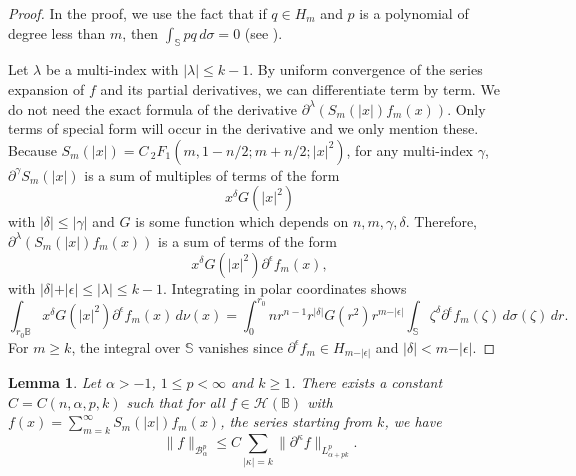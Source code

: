\documentclass{amsart}
\newtheorem{lemma}[theorem]{Lemma}
\theoremstyle{definition}
\theoremstyle{remark}
\begin{document}
\begin{proof}
In the proof, we use the fact that if $q\in H_m$ and $p$ is a polynomial
of degree less than $m$, then $\int_{\mathbb S} pq\,d\sigma=0$
(see \cite[Proposition 5.9]{ABR}).

Let $\lambda$ be a multi-index with $\vert\lambda\vert\le k-1$.
By uniform convergence of the series expansion of $f$ and its partial
derivatives, we can differentiate term by term.
We do not need the exact formula of the derivative
$\partial^\lambda(S_m(\vert x\vert)f_m(x))$.
Only terms of special form will occur in the derivative and we only mention these.
Because $S_m(\vert x\vert)=C\,{}_2F_1(m,1-n/2;m+n/2;\vert x\vert^2)$,
for any multi-index $\gamma$, $\partial^\gamma S_m(\vert x\vert)$ is a
sum of multiples of terms of the form
\begin{equation*}
x^\delta G(\vert x\vert^2)
\end{equation*}
with
$\vert\delta\vert \le\vert\gamma\vert$ and $G$ is some function which
depends on $n,m,\gamma,\delta$.
Therefore, $\partial^\lambda(S_m(\vert x\vert)f_m(x))$ is a sum of terms
of the form
\begin{equation*}
x^\delta G(\vert x\vert^2)\partial^\epsilon f_m(x),
\end{equation*}
with $\vert\delta\vert+\vert\epsilon\vert \le \vert\lambda\vert\le k-1$.
Integrating in polar coordinates shows
\begin{equation*}
\int_{r_0\mathbb B} x^\delta G(\vert x\vert^2)\partial^\epsilon f_m(x)\,d\nu(x)
=\int_0^{r_0} nr^{n-1} r^{\vert\delta\vert}G(r^2)r^{m-\vert\epsilon\vert}
\int_{\mathbb S} \zeta^\delta\partial^\epsilon f_m(\zeta)\,d\sigma(\zeta)\,dr.
\end{equation*}
For $m\ge k$, the integral over $\mathbb S$ vanishes since
$\partial^\epsilon f_m\in H_{m-\vert\epsilon\vert}$ and
$\vert\delta\vert<m-\vert\epsilon\vert$.
\end{proof}

\begin{lemma}\label{LStartk}
Let $\alpha>-1$, $1\le p<\infty$ and $k\ge 1$.
There exists a constant $C=C(n,\alpha,p,k)$ such that for all
$f\in\mathcal H(\mathbb B)$ with
$f(x)=\sum_{m=k}^\infty S_m(\vert x\vert)f_m(x)$,
the series starting from $k$, we have
\begin{equation*}
\|f\|_{\mathcal B^p_\alpha}
\le C \sum_{\vert\kappa\vert=k} \|\partial^\kappa f\|_{L^p_{\alpha+pk}}.
\end{equation*}
\end{lemma}
\end{document}
